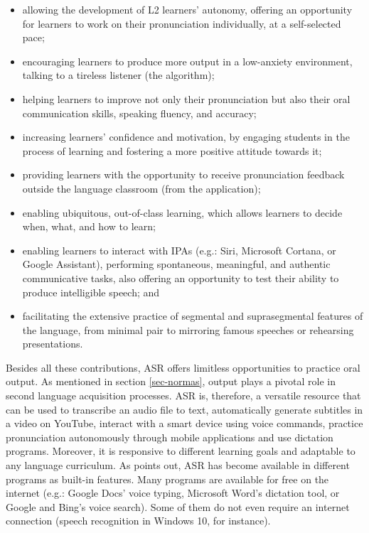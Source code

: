 \documentclass[english]{textolivre}
\begin{document}
\begin{itemize}
    \item allowing the development of L2 learners’ autonomy, offering an opportunity for learners to work on their pronunciation individually, at a self-selected pace;
    \item encouraging learners to produce more output in a low-anxiety environment, talking to a tireless listener (the algorithm);
    \item helping learners to improve not only their pronunciation but also their oral communication skills, speaking fluency, and accuracy;
    \item increasing learners’ confidence and motivation, by engaging students in the process of learning and fostering a more positive attitude towards it;
    \item providing learners with the opportunity to receive pronunciation feedback outside the language classroom (from the application);
    \item enabling ubiquitous, out-of-class learning, which allows learners to decide when, what, and how to learn;
    \item enabling learners to interact with IPAs (e.g.: Siri, Microsoft Cortana, or Google Assistant), performing spontaneous, meaningful, and authentic communicative tasks, also offering an opportunity to test their ability to produce intelligible speech; and
    \item facilitating the extensive practice of segmental and suprasegmental features of the language, from minimal pair to mirroring famous speeches or rehearsing presentations.
\end{itemize}

Besides all these contributions, ASR offers limitless opportunities to practice oral output. As mentioned in section \ref{sec-normas}, output plays a pivotal role in second language acquisition processes. ASR is, therefore, a versatile resource that can be used to transcribe an audio file to text, automatically generate subtitles in a video on YouTube, interact with a smart device using voice commands, practice pronunciation autonomously through mobile applications and use dictation programs. Moreover, it is responsive to different learning goals and adaptable to any language curriculum. As \textcite{yoshida_choosing_2018} points out, ASR has become available in different programs as built-in features. Many programs are available for free on the internet (e.g.: Google Docs’ voice typing, Microsoft Word’s dictation tool, or Google and Bing’s voice search). Some of them do not even require an internet connection (speech recognition in Windows 10, for instance).
\end{document}
